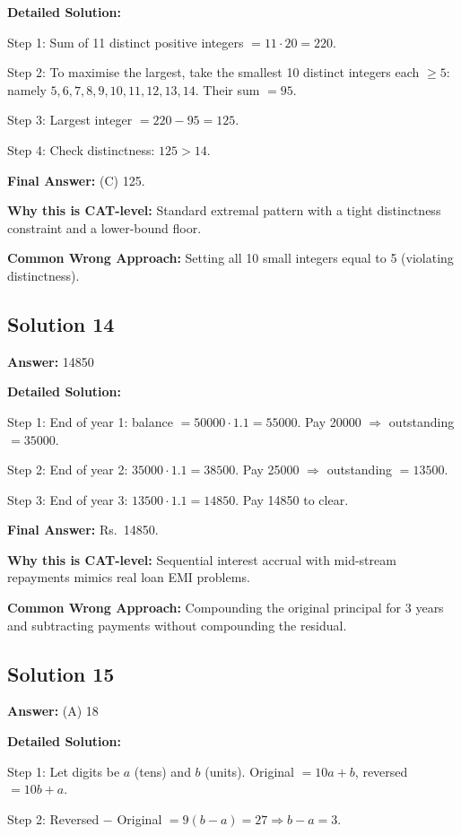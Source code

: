 \documentclass[11pt]{article}
\begin{document}
\textbf{Detailed Solution:}

Step 1: Sum of 11 distinct positive integers $= 11 \cdot 20 = 220$.

Step 2: To maximise the largest, take the smallest 10 distinct integers each $\ge 5$: namely $5, 6, 7, 8, 9, 10, 11, 12, 13, 14$. Their sum $= 95$.

Step 3: Largest integer $= 220 - 95 = 125$.

Step 4: Check distinctness: $125 > 14$. \checkmark

\textbf{Final Answer:} (C) 125.

\textbf{Why this is CAT-level:} Standard extremal pattern with a tight distinctness constraint and a lower-bound floor.

\textbf{Common Wrong Approach:} Setting all 10 small integers equal to 5 (violating distinctness).

\subsection*{Solution 14}
\textbf{Answer:} 14850

\textbf{Detailed Solution:}

Step 1: End of year 1: balance $= 50000 \cdot 1.1 = 55000$. Pay 20000 $\Rightarrow$ outstanding $= 35000$.

Step 2: End of year 2: $35000 \cdot 1.1 = 38500$. Pay 25000 $\Rightarrow$ outstanding $= 13500$.

Step 3: End of year 3: $13500 \cdot 1.1 = 14850$. Pay 14850 to clear.

\textbf{Final Answer:} Rs.\ 14850.

\textbf{Why this is CAT-level:} Sequential interest accrual with mid-stream repayments mimics real loan EMI problems.

\textbf{Common Wrong Approach:} Compounding the original principal for 3 years and subtracting payments without compounding the residual.

\subsection*{Solution 15}
\textbf{Answer:} (A) 18

\textbf{Detailed Solution:}

Step 1: Let digits be $a$ (tens) and $b$ (units). Original $= 10a + b$, reversed $= 10b + a$.

Step 2: Reversed $-$ Original $= 9(b - a) = 27 \Rightarrow b - a = 3$.
\end{document}
